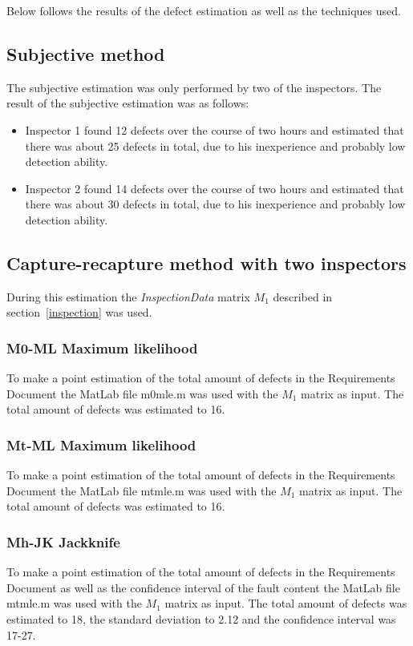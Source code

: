 Below follows the results of the defect estimation as well as the techniques used.

\subsection{Subjective method}
The subjective estimation was only performed by two of the inspectors.
The result of the subjective estimation was as follows:
\begin{itemize}
\item Inspector 1 found 12 defects over the course of two hours and estimated that there was about 25 defects in total, due to his inexperience and probably low detection ability.
\item Inspector 2 found 14 defects over the course of two hours and estimated that there was about 30 defects in total, due to his inexperience and probably low detection ability.
\end{itemize}

\subsection{Capture-recapture method with two inspectors}
During this estimation the \textit{InspectionData} matrix $M_{1}$ described in section~\ref{inspection} was used.
\subsubsection{M0-ML Maximum likelihood}

To make a point estimation of the total amount of defects in the Requirements Document the MatLab file m0mle.m was used with the $M_{1}$ matrix as input. The total amount of defects was estimated to 16.
\subsubsection{Mt-ML Maximum likelihood}
To make a point estimation of the total amount of defects in the Requirements Document the MatLab file mtmle.m was used with the $M_{1}$ matrix as input. The total amount of defects was estimated to 16.
\subsubsection{Mh-JK Jackknife}
To make a point estimation of the total amount of defects in the Requirements Document as well as the confidence interval of the fault content the MatLab file mtmle.m was used with the $M_{1}$ matrix as input. The total amount of defects was estimated to 18, the standard deviation to 2.12 and the confidence interval was 17-27.

